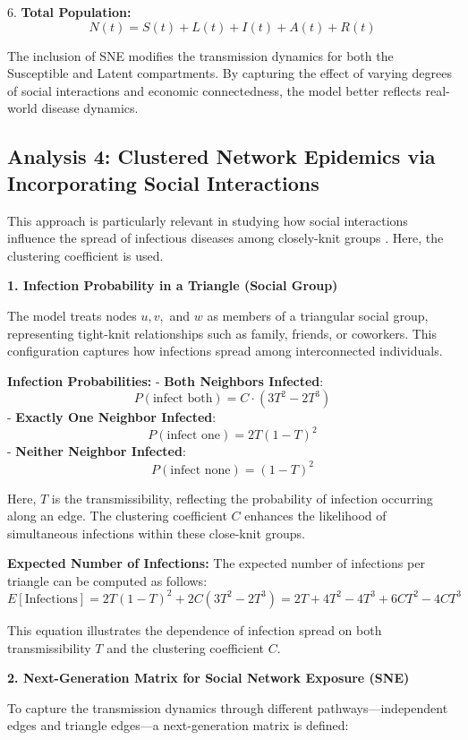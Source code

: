 \documentclass[9 pt]{article} %
\begin{document}
6. \textbf{Total Population:}
   \[
   N(t) = S(t) + L(t) + I(t) + A(t) + R(t)
   \]

The inclusion of SNE modifies the transmission dynamics for both the Susceptible and Latent compartments. By capturing the effect of varying degrees of social interactions and economic connectedness, the model better reflects real-world disease dynamics.


\subsection{Analysis 4: Clustered Network Epidemics via Incorporating Social Interactions}

This approach is particularly relevant in studying how social interactions influence the spread of infectious diseases among closely-knit groups \cite{miller2009percolation}. Here, the clustering coefficient is used.

\textbf{1. Infection Probability in a Triangle (Social Group)}

The model treats nodes \( u, v, \) and \( w \) as members of a triangular social group, representing tight-knit relationships such as family, friends, or coworkers. This configuration captures how infections spread among interconnected individuals.

\textbf{Infection Probabilities:}
- \textbf{Both Neighbors Infected}:
  \[
  P(\text{infect both}) = C \cdot (3T^2 - 2T^3)
  \]
- \textbf{Exactly One Neighbor Infected}:
  \[
  P(\text{infect one}) = 2T(1 - T)^2
  \]
- \textbf{Neither Neighbor Infected}:
  \[
  P(\text{infect none}) = (1 - T)^2
  \]

Here, \( T \) is the transmissibility, reflecting the probability of infection occurring along an edge. The clustering coefficient \( C \) enhances the likelihood of simultaneous infections within these close-knit groups.

\textbf{Expected Number of Infections:} The expected number of infections per triangle can be computed as follows:
\[
E[\text{Infections}] = 2T(1 - T)^2 + 2C(3T^2 - 2T^3) = 2T + 4T^2 - 4T^3 + 6CT^2 - 4CT^3
\]

This equation illustrates the dependence of infection spread on both transmissibility \( T \) and the clustering coefficient \( C \).

\textbf{2. Next-Generation Matrix for Social Network Exposure (SNE)}

To capture the transmission dynamics through different pathways—independent edges and triangle edges—a next-generation matrix is defined:
\end{document}
